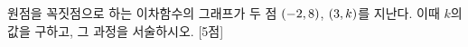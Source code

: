원점을 꼭짓점으로 하는 이차함수의 그래프가 두 점 $(-2{,}\mkern3mu 8)$, $(3{,}\mkern3mu k)$를 지난다. 이때 $k$의 값을 구하고, 그 과정을 서술하시오. \mbox{[5점]}
